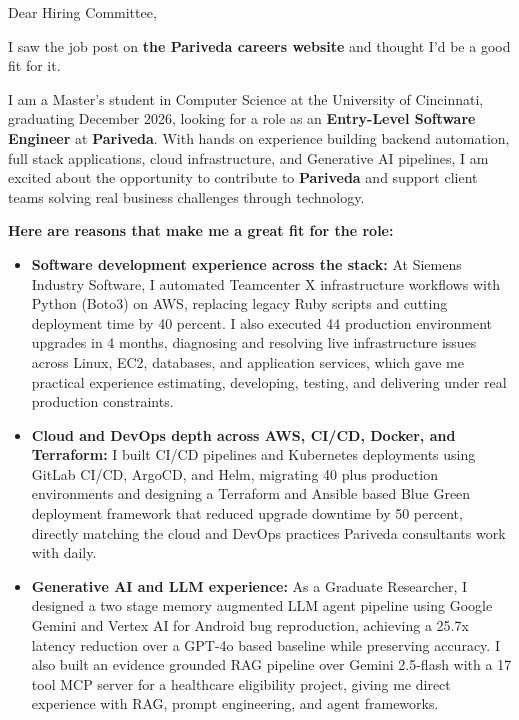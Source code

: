 \documentclass[11pt]{letter}
\date{}
\begin{document}
\begin{letter}{}

\opening{Dear Hiring Committee,}

I saw the job post on \textbf{the Pariveda careers website} and thought I'd be a good fit for it.

I am a Master's student in Computer Science at the University of Cincinnati, graduating December 2026, looking for a role as an \textbf{Entry-Level Software Engineer} at \textbf{Pariveda}. With hands on experience building backend automation, full stack applications, cloud infrastructure, and Generative AI pipelines, I am excited about the opportunity to contribute to \textbf{Pariveda} and support client teams solving real business challenges through technology.

\textbf{Here are reasons that make me a great fit for the role:}

\begin{itemize}[leftmargin=*, itemsep=0.45em]
    \item \textbf{Software development experience across the stack:} At Siemens Industry Software, I automated Teamcenter X infrastructure workflows with Python (Boto3) on AWS, replacing legacy Ruby scripts and cutting deployment time by 40 percent. I also executed 44 production environment upgrades in 4 months, diagnosing and resolving live infrastructure issues across Linux, EC2, databases, and application services, which gave me practical experience estimating, developing, testing, and delivering under real production constraints.

    \item \textbf{Cloud and DevOps depth across AWS, CI/CD, Docker, and Terraform:} I built CI/CD pipelines and Kubernetes deployments using GitLab CI/CD, ArgoCD, and Helm, migrating 40 plus production environments and designing a Terraform and Ansible based Blue Green deployment framework that reduced upgrade downtime by 50 percent, directly matching the cloud and DevOps practices Pariveda consultants work with daily.

    \item \textbf{Generative AI and LLM experience:} As a Graduate Researcher, I designed a two stage memory augmented LLM agent pipeline using Google Gemini and Vertex AI for Android bug reproduction, achieving a 25.7x latency reduction over a GPT-4o based baseline while preserving accuracy. I also built an evidence grounded RAG pipeline over Gemini 2.5-flash with a 17 tool MCP server for a healthcare eligibility project, giving me direct experience with RAG, prompt engineering, and agent frameworks.


\end{itemize}
\end{letter}
\end{document}
